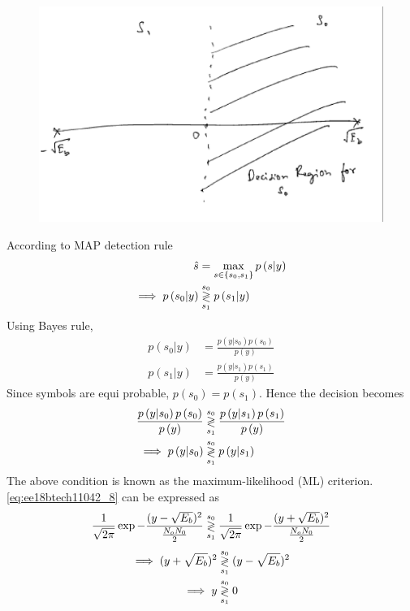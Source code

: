 \documentclass[10pt, a4paper]{article}
\providecommand{\brak}[1]{\ensuremath{\left(#1\right)}}
\begin{document}
\begin{enumerate}
%
\begin{figure}[!h]
\centering
\includegraphics[width=\columnwidth]{images/bpsk.eps}
\caption{}
\label{fig:bpsk_const}
\end{figure}
\solution
According to MAP detection rule
\begin{align}
    \hat{s} &= \max_{s \in  \cbrak{s_0,s_1}} p\brak{s|y}
    \label{eq:ee18btech11042_3}
\\
    \implies p\brak{s_0|y} &\dec{s_0}{s_1} p\brak{s_1|y}
    \label{eq:ee18btech11042_4}
\end{align}
Using Bayes rule,
\begin{align}
    p\brak{s_0|y} &= \frac{p\brak{y|s_0}p\brak{s_0}}{p\brak{y}}
    \label{eq:ee18btech11042_5}
\\
    p\brak{s_1|y} &= \frac{p\brak{y|s_1}p\brak{s_1}}{p\brak{y}}
    \label{eq:ee18btech11042_6}
\end{align}
Since symbols are equi probable,  $p\brak{s_0} =  p\brak{s_1}$.  Hence the decision becomes
\begin{align}
    \frac{p\brak{y|s_0}p\brak{s_0}}{p\brak{y}} &\dec{s_0}{s_1}  \frac{p\brak{y|s_1}p\brak{s_1}}{p\brak{y}}
    \label{eq:ee18btech11042_7}
\\
    \implies p\brak{y|s_0} &\dec{s_0}{s_1} p\brak{y|s_1}
    \label{eq:ee18btech11042_8}
\end{align}
The above condition is known as the maximum-likelihood (ML) criterion.      \eqref{eq:ee18btech11042_8}
can be expressed as
{\small
\begin{align}
    \frac{1}{\sqrt{2\pi}} \exp{-\frac{(y-\sqrt{E_b})^2}{\frac{N_oN_0}{2}}}  \overset{s_0}{\underset{s_1}{\gtrless}}   
    \frac{1}{\sqrt{2\pi}} \exp{-\frac{(y+\sqrt{E_b})^2}{\frac{N_oN_0}{2}}}
    \label{eq:ee18btech11042_9}
\end{align}
}
\begin{align}
     \implies (y+\sqrt{E_b})^2 &\overset{s_0}{\underset{s_1}{\gtrless}} (y - \sqrt{E_b})^2
     \label{eq:ee18btech11042_10}
\\
    \implies y &\overset{s_0}{\underset{s_1}{\gtrless}} 0
    \label{eq:ee18btech11042_11}
\end{align}





\end{enumerate}
\end{document}
